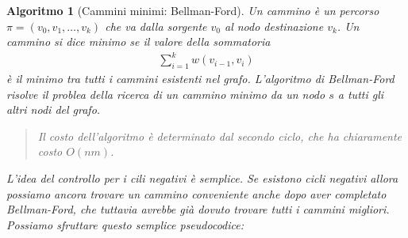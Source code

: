 \documentclass[oneside]{book}
\newtheorem{alg}{Algoritmo}
\begin{document}
\begin{alg}[Cammini minimi: Bellman-Ford]
  Un cammino \`e un percorso $\pi = (v_0, v_1, \ldots, v_k)$ che va dalla sorgente $v_0$
  al nodo destinazione $v_k$. Un cammino si dice minimo se il valore della sommatoria
  \begin{align*}
    \sum_{i=1}^k w(v_{i-1}, v_i)
  \end{align*}
  \`e il minimo tra tutti i cammini esistenti nel grafo. L'algoritmo di Bellman-Ford
  risolve il problea della ricerca di un cammino minimo da un nodo $s$ a tutti
  gli altri nodi del grafo.

  \begin{algorithm}[H]
  \end{algorithm}
  \begin{quote}
    Il costo dell'algoritmo \`e determinato dal secondo ciclo, che ha chiaramente
    costo $O(nm)$.
  \end{quote}
  L'idea del controllo per i cili negativi \`e semplice. Se esistono cicli negativi
  allora possiamo ancora trovare un cammino conveniente anche dopo aver completato
  Bellman-Ford, che tuttavia avrebbe gi\`a dovuto trovare tutti i cammini migliori.
  Possiamo sfruttare questo semplice pseudocodice:

  \begin{algorithm}[H]
  \end{algorithm}
\end{alg}
\end{document}
